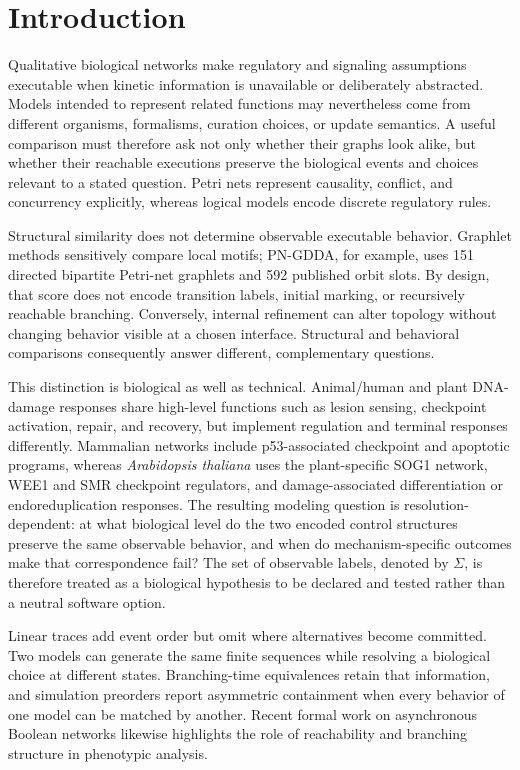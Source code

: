 \documentclass{ws-jbcb}
\numberwithin{equation}{section}
\newcommand{\tas}{\textit{Arabidopsis thaliana}}
\begin{document}
\section{Introduction}\label{sec:introduction}

Qualitative biological networks make regulatory and signaling assumptions
executable when kinetic information is unavailable or deliberately abstracted.
Models intended to represent related functions may nevertheless come from
different organisms, formalisms, curation choices, or update semantics. A useful
comparison must therefore ask not only whether their graphs look alike, but
whether their reachable executions preserve the biological events and choices
relevant to a stated question. Petri nets represent causality, conflict, and
concurrency explicitly, whereas logical models encode discrete regulatory
rules.\cite{Murata1989,ChaouiyaPetriBio2007,Li2006,Fisher2007}

Structural similarity does not determine observable executable behavior.
Graphlet methods sensitively compare local motifs; PN-GDDA, for example, uses
151 directed bipartite Petri-net graphlets and 592 published orbit
slots.\cite{Szawulak2022} By design, that score does not encode transition
labels, initial marking, or recursively reachable branching. Conversely,
internal refinement can alter topology without changing behavior visible at a
chosen interface. Structural and behavioral comparisons consequently answer
different, complementary questions.

This distinction is biological as well as technical. Animal/human and plant
DNA-damage responses share high-level functions such as lesion sensing,
checkpoint activation, repair, and recovery, but implement regulation and
terminal responses differently. Mammalian networks include p53-associated
checkpoint and apoptotic programs, whereas \tas{} uses the plant-specific SOG1
network, WEE1 and SMR checkpoint regulators, and damage-associated
differentiation or endoreduplication responses.\cite{JacksonBartek2009,
BlackfordJackson2017,Yoshiyama2013,DeSchutter2007,Yi2014,Adachi2011}
The resulting modeling question is resolution-dependent: at what biological
level do the two encoded control structures preserve the same observable
behavior, and when do mechanism-specific outcomes make that correspondence
fail? The set of observable labels, denoted by $\Sigma$, is therefore treated as
a biological hypothesis to be declared and tested rather than a neutral
software option.

Linear traces add event order but omit where alternatives become committed.
Two models can generate the same finite sequences while resolving a biological
choice at different states. Branching-time equivalences retain that information,
and simulation preorders report asymmetric containment when every behavior of one
model can be matched by another. Recent formal work on asynchronous Boolean
networks likewise highlights the role of reachability and branching structure in
phenotypic analysis.\cite{Yizengaw2026}
\end{document}
